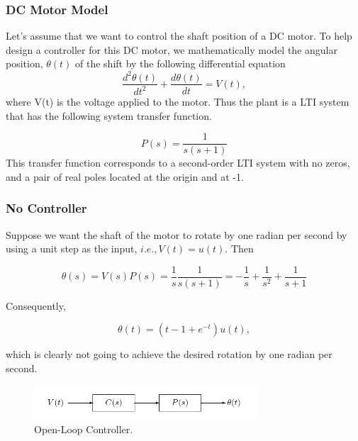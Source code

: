 \documentclass{article}
\begin{document}
{{        \subsubsection{DC Motor Model}
        {
            Let's assume that we want to control the shaft position of a DC motor. To help design a controller for
            this DC motor, we mathematically model the angular position, $\theta (t)$ of the shift by the following differential equation
            \begin{equation}
                \frac{d^{2}\theta (t)}{dt^{2}} + \frac{d\theta (t)}{dt} = V(t),
                \label{eq:eq5}
            \end{equation}
            where V(t) is the voltage applied to the motor. Thus the plant is a LTI system that has the following system transfer function.

            \begin{equation}
                P(s) = \frac{1}{s(s+1)}
                \label{eq:eq6}
            \end{equation}
            This transfer function corresponds to a second-order LTI system with no zeros, and a pair of real poles located at the origin and at -1.
        }
        \subsubsection{No Controller}
        {
            Suppose we want the shaft of the motor to rotate by one radian per second by using a unit step as the input, $i.e., V(t) = u(t)$. Then

            \begin{equation}
                \theta(s)=V(s) P(s)=\frac{1}{s} \frac{1}{s(s+1)}=-\frac{1}{s}+\frac{1}{s^{2}}+\frac{1}{s+1}
                \label{eq:eq7}
            \end{equation}

            Consequently,

            \begin{equation}
                \theta(t)=\left(t-1+e^{-t}\right) u(t),
            \end{equation}

            which is clearly not going to achieve the desired rotation by one radian per second.

            \begin{figure}[H]
                \centering
                \includegraphics[width=0.75\textwidth]{figures/lab3_3.png}
                \caption{Open-Loop Controller.}
                \label{fig:lab3_3}
            \end{figure}

}}}
\end{document}
